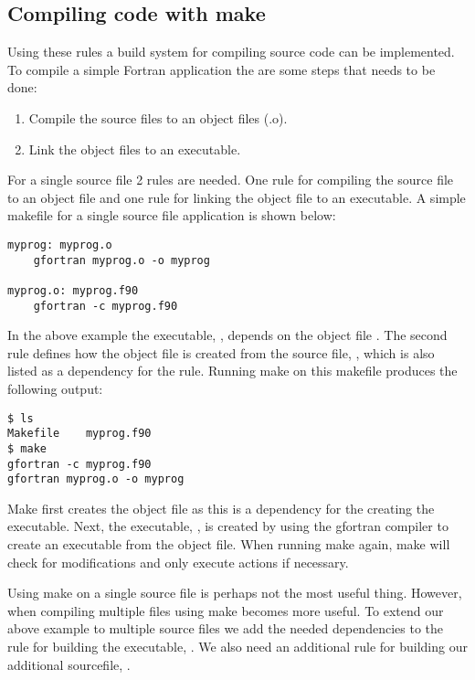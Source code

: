 \subsection{Compiling code with make}

Using these rules a build system for compiling source code can be implemented. To compile a simple Fortran application the are some steps that needs to be done:

\begin{enumerate}
\item Compile the source files to an object files (.o).
\item Link the object files to an executable.
\end{enumerate}

For a single source file 2 rules are needed. One rule for compiling the source file to an object file and one rule for linking the object file to an executable. A simple makefile for a single source file application is shown below:

\mmode

\begin{lstlisting}
myprog: myprog.o 
	gfortran myprog.o -o myprog

myprog.o: myprog.f90 
	gfortran -c myprog.f90
\end{lstlisting}

In the above example the executable, , depends on the object file . The second rule defines how the object file  is created from the source file, , which is also listed as a dependency for the rule. Running make on this makefile produces the following output:

\cmdmode

\begin{lstlisting}
$ ls
Makefile	myprog.f90
$ make
gfortran -c myprog.f90
gfortran myprog.o -o myprog
\end{lstlisting}

Make first creates the  object file as this is a dependency for the creating the  executable. Next, the executable, , is created by using the gfortran compiler to create an executable from the object file. When running make again, make will check for modifications and only execute actions if necessary. 

Using make on a single source file is perhaps not the most useful thing. However, when compiling multiple files using make becomes more useful. To extend our above example to multiple source files we add the needed dependencies to the rule for building the executable, . We also need an additional rule for building our additional sourcefile, .

